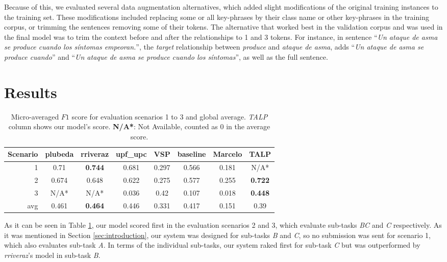 \documentclass[a4paper,11pt,twocolumn,twoside]{article}
\begin{document}
Because of this, we evaluated several data augmentation alternatives, which added slight modifications of the original training instances to the training set. These modifications included replacing some or all key-phrases by their class name or other key-phrases in the training corpus, or trimming the sentences removing some of their tokens. The alternative that worked best in the validation corpus and was used in the final model was to trim the context before and after the relationships to 1 and 3 tokens. For instance, in sentence  ``\emph{Un ataque de asma se produce cuando los síntomas empeoran.}'', the \emph{target} relationship between \emph{produce} and \emph{ataque de asma}, adds  ``\emph{Un ataque de asma se produce cuando}'' and  ``\emph{Un ataque de asma se produce cuando los síntomas}'', as well as the full sentence.

\section{Results}

\begin{table}[ht]
    \centering
\begin{tabular}{r|cccccc|c}
\toprule
Scenario & plubeda & rriveraz & upf\_upc & VSP & baseline & Marcelo & TALP \\
\midrule
1 & 0.71 & \textbf{0.744} & 0.681 & 0.297 & 0.566 & 0.181 & N/A* \\
2 & 0.674 & 0.648 & 0.622 & 0.275 & 0.577 & 0.255 & \textbf{0.722} \\
3 & N/A* & N/A* & 0.036 & 0.42 & 0.107 & 0.018 & \textbf{0.448} \\
\bottomrule
avg & 0.461 & \textbf{0.464} & 0.446 & 0.331 & 0.417 & 0.151 & 0.39 \\
\end{tabular}
    \caption{Micro-averaged $F1$ score for evaluation scenarios 1 to 3 and global average. \emph{TALP} column shows our model's score. \textbf{N/A*}: Not Available, counted as 0 in the average score.}
    \label{tab:results}
\end{table}

As it can be seen in Table \ref{tab:results}, our model scored first in the evaluation scenarios 2 and 3, which evaluate sub-tasks \emph{BC} and \emph{C} respectively. As it was mentioned in Section \ref{sec:introduction}, our system was designed for sub-tasks \emph{B} and \emph{C}, so no submission was sent for scenario 1, which also evaluates sub-task \emph{A}. In terms of the individual sub-tasks, our system raked first for sub-task \emph{C} but was outperformed by \emph{rriveraz}'s model in sub-task \emph{B}.
\end{document}
